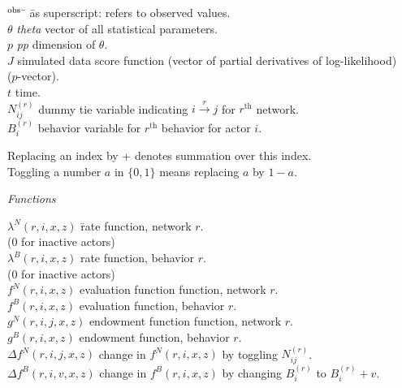 \documentclass[a4paper,fleqn,12pt]{article}
\newcommand{\nnm}[1]{\textsf{\small\textit{#1}}}
\begin{document}
\begin{tabbing}
$^{\rm{obs}}$ \hspace*{1em} \=  \hspace*{6em} \= as superscript: refers to observed values.\\[1ex]
$\theta$ \> \nnm{theta} \> vector of all statistical parameters. \\[1ex]
$p$  \>  \nnm{pp}  \> dimension of $\theta$.\\[1ex]
$J$ \> \>  simulated data score function (vector of partial derivatives of log-likelihood) \\
     \>  \>    ($p$-vector).\\[1ex]
$t$ \hspace*{3em} \> \> time.\\[1ex]
$N^{(r)}_{ij}$ \> \> dummy tie variable indicating $ i \stackrel{r}{\rightarrow} j $ for $r^{\text{th}}$ network.\\[1ex]
$B^{(r)}_{i}$ \> \> behavior variable for $r^{\text{th}}$ behavior for actor $i$.
\end{tabbing}
\medskip

Replacing an index by + denotes summation over this index.\\
Toggling a number $a$ in $\{0, 1\}$ means replacing $a$ by $1-a$.
\medskip

\emph{Functions}

\begin{tabbing}
$\lambda^N(r,i,x,z)$ \hspace*{3em} \= rate function, network $r$.\\
                                  \> (0 for inactive actors)\\[1ex]
$\lambda^B(r,i,x,z)$ \hspace*{3em} \> rate function, behavior $r$.\\
                                  \> (0 for inactive actors)\\[1ex]
$f^N(r,i,x,z)$ \hspace*{3em} \> evaluation function function, network $r$.\\[1ex]
$f^B(r,i,x,z)$ \hspace*{3em} \> evaluation function, behavior $r$.\\[1ex]
$g^N(r,i,j,x,z)$ \hspace*{3em} \> endowment function function, network $r$.\\[1ex]
$g^B(r,i,x,z)$ \hspace*{3em} \> endowment function, behavior $r$.\\[1ex]
$\Delta f^N(r,i,j,x,z)$ \hspace*{3em} \> change in $f^N(r,i,x,z)$
                                by toggling $N^{(r)}_{ij}$.\\[1ex]
$\Delta f^B(r,i,v,x,z)$ \hspace*{3em} \> change in $f^B(r,i,x,z)$
                                by changing $B^{(r)}_i$ to $B^{(r)}_i + v$.
\end{tabbing}
\end{document}
